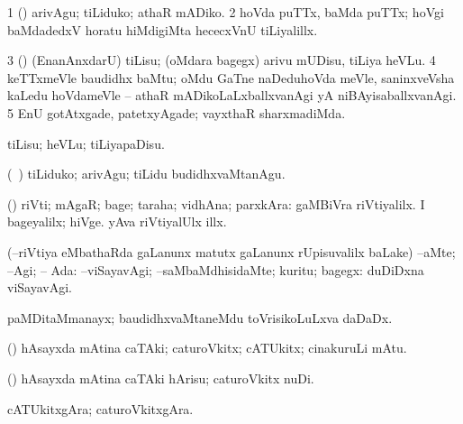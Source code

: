 {{{{{{\noindent 
\gl{\pagu}
\bmng
\bnum
\num{1}   (\AmA) arivAgu; tiLiduko; athaR mADiko. 
\num{2}  hoVda puTTx, baMda puTTx; hoVgi baMdadedxV horatu hiMdigiMta hececxVnU tiLiyalillx. 
\num{3}  (\AmA) (EnanAnxdarU) tiLisu; (oMdara bagegx) arivu mUDisu, tiLiya heVLu. 
\num{4}  keTTxmeVle baudidhx baMtu; oMdu GaTne naDeduhoVda meVle, saninxveVsha kaLedu hoVdameVle -- athaR mADikoLaLxballxvanAgi yA niBAyisaballxvanAgi. 
\num{5}  EnU gotAtxgade, patetxyAgade; vayxthaR sharxmadiMda. 
\enum
\emng
\eentry

\bentry
{} 
\gl{\sakirx}
\bmng
tiLisu; heVLu; tiLiyapaDisu. 
\emng

\noindent
\gl{\akirx}
\bmng
(\kanmu\ \ame) tiLiduko; arivAgu; tiLidu budidhxvaMtanAgu. 
\emng

\noindent 
\gl{\pagu}
\bmng
{} 
\emng
\eentry

\bentry
{} 
\gl{\nA}
\expl{}
\bmng
(\pArxparx) riVti; mAgaR; bage; taraha; vidhAna; parxkAra:  gaMBiVra riVtiyalilx.  I bageyalilx; hiVge.  yAva riVtiyalUlx illx. 
\emng
\eentry

\bentry
{}
\gl{\uparx}
\expl{}
\bmng
(--riVtiya eMbathaRda \gu gaLanunx matutx \kirxvi gaLanunx rUpisuvalilx baLake) 
\banum
{} --aMte; --Agi; -- Ada:  
 --viSayavAgi; --saMbaMdhisidaMte; kuritu; bagegx:  duDiDxna viSayavAgi. 
\eanum
\emng
\eentry

\bentry
{}
  \gl{\nA}\bmng
paMDitaMmanayx; baudidhxvaMtaneMdu toVrisikoLuLxva daDaDx. 
\emng
\eentry

\bentry
{}
  \gl{\nA}\bmng
(\AmA) hAsayxda mAtina caTAki; caturoVkitx; cATUkitx; cinakuruLi mAtu. 
\emng
\eentry

\bentry
{}
\gl{\akirx}
\bmng
(\AmA) hAsayxda mAtina caTAki hArisu; caturoVkitx nuDi. 
\emng
\eentry

\bentry
{}
\gl{\nA}
\bmng
cATUkitxgAra; caturoVkitxgAra. 
\emng
\eentry

}}}}}}
